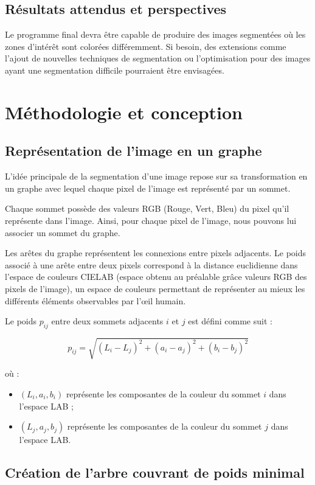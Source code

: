 \documentclass[a4paper,12pt]{report}
\begin{document}
\section{Résultats attendus et perspectives}
Le programme final devra être capable de produire des images segmentées où les zones d'intérêt sont colorées différemment. Si besoin, des extensions comme l'ajout de nouvelles techniques de segmentation ou l'optimisation pour des images ayant une segmentation difficile pourraient être envisagées.


\chapter{Méthodologie et conception}

\section{Représentation de l'image en un graphe}

L'idée principale de la segmentation d'une image repose sur sa transformation en un graphe avec lequel chaque pixel de l'image est représenté par un sommet. 

Chaque sommet possède des valeurs RGB (Rouge, Vert, Bleu) du pixel qu'il représente dans l'image. Ainsi, pour chaque pixel de l'image, nous pouvons lui associer un sommet du graphe.

Les arêtes du graphe représentent les connexions entre pixels adjacents. Le poids associé à une arête entre deux pixels correspond à la distance euclidienne dans l'espace de couleurs CIELAB (espace obtenu au préalable grâce valeurs RGB des pixels de l'image), un espace de couleurs permettant de représenter au mieux les différents éléments observables par l'œil humain.

Le poids \( p_{ij} \) entre deux sommets adjacents \( i \) et \( j \) est défini comme suit :

\[
p_{ij} = \sqrt{(L_i - L_j)^2 + (a_i - a_j)^2 + (b_i - b_j)^2}
\]

où :
\begin{itemize}
    \item \( (L_i, a_i, b_i) \) représente les composantes de la couleur du sommet \( i \) dans l'espace LAB ;
    \item \( (L_j, a_j, b_j) \) représente les composantes de la couleur du sommet \( j \) dans l'espace LAB.
\end{itemize}

\section{Création de l'arbre couvrant de poids minimal}
\end{document}
